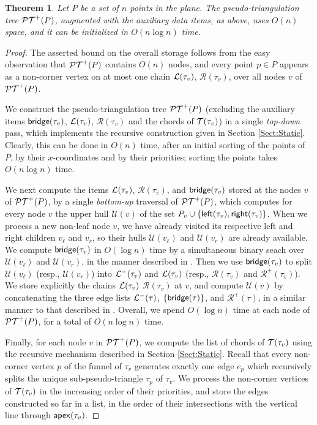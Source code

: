 \documentclass[11pt]{article}
\def\bridge{{\sf bridge}}
\def\U{{\mathcal U}}
\def\PT{{\cal PT}}
\def\T{{\cal T}}
\def\U{\mathcal{U}}
\def\L{{\cal L}}
\def\R{\mathcal{R}}
\def\Left{{\sf left}}
\def\Right{{\sf right}}
\def\apex{{\sf apex}}
\newtheorem{theorem}{Theorem}[section]
\begin{document}
\begin{theorem}\label{Thm:InitStructure}
  Let $P$ be a set of $n$ points in the plane.  The
  pseudo-triangulation tree $\PT^+(P)$, augmented with the auxiliary data items,
  as above, uses $O(n)$ space, and it can be initialized in $O(n\log
  n)$ time.
\end{theorem}
\begin{proof}
  The asserted bound on the overall storage follows from the easy
  observation that $\PT^+(P)$ contains $O(n)$ nodes, and every point
  $p\in P$ appears as a non-corner vertex on at most one chain
  $\L(\tau_v)$, $\R(\tau_v)$, over all nodes $v$ of $\PT^+(P)$.

  We construct the pseudo-triangulation tree $\PT^+(P)$ (excluding the
  auxiliary items $\bridge(\tau_v)$, $\L(\tau_v)$, $\R(\tau_v)$ and
  the chords of $\T(\tau_v)$) in a single \textit{top-down} pass, which implements the recursive construction given in Section \ref{Sect:Static}.  Clearly, this can be done
  in $O(n)$ time, after an initial sorting of the points of $P$, by their
  $x$-coordinates and by their priorities; sorting the points
  takes
  $O(n\log n)$ time.


  We next compute the items $\L(\tau_v)$, $\R(\tau_v)$, and $\bridge(\tau_v)$
  stored at the nodes $v$ of $\PT^+(P)$, by a single \textit{bottom-up}
  traversal of $\PT^+(P)$, which computes for every node $v$ the upper
  hull $\U(v)$ of the set $P_v\cup \{\Left(\tau_v),\Right(\tau_v)\}$.
  When we process a new non-leaf node $v$, we have already visited
  its respective left and right children $v_\ell$ and $v_r$, so their hulls $\U(v_\ell)$ and $\U(v_r)$ are already available.  We compute
  $\bridge(\tau_v)$ in $O(\log n)$ time by a simultaneous binary seach
  over $\U(v_\ell)$ and $\U(v_r)$, in the manner described in
  \cite{Overmars}. Then we use  $\bridge(\tau_v)$
  to split $\U(v_\ell)$ (resp.,
  $\U(v_r)$) into $\L^-(\tau_v)$ and $\L(\tau_v)$ (resp., $\R(\tau_v)$
  and $\R^+(\tau_v)$).  We store explicitly the chains $\L(\tau_v)$ $\R(\tau_v)$ at
  $v$, and compute $\U(v)$ by concatenating the three edge lists
  $\L^-(\tau)$, $\{\bridge(\tau)\}$, and $\R^+(\tau)$, in a similar manner to that described in \cite{AKS}. Overall, we spend
  $O(\log n)$ time at each node of $\PT^+(P)$, for a total of
  $O(n\log n)$ time.

  Finally, for each node $v$ in $\PT^+(P)$, we compute the list of chords of
  $\T(\tau_v)$ using the recursive mechanism described in Section \ref{Sect:Static}.
  Recall that every non-corner vertex $p$ of the funnel of $\tau_v$ generates
  exactly one edge $e_p$ which recursively splits the unique
  sub-pseudo-triangle $\tau_p$ of $\tau_v$. We process the non-corner
  vertices of $\T(\tau_v)$ in the increasing order of their
  priorities, and store the edges constructed so far in a list, in
  the order of their intersections with the vertical line through
  $\apex(\tau_v)$.


\end{proof}
\end{document}
